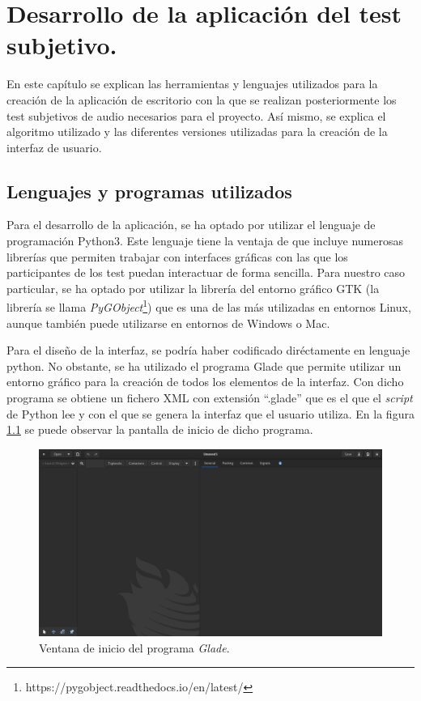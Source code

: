 \documentclass[11pt,a4paper,twoside]{book}
\author{Víctor de Tejada Molera}
\begin{document}
    \chapter{Desarrollo de la aplicación del test subjetivo.}
        En este capítulo se explican las herramientas y lenguajes utilizados para la creación de la aplicación de escritorio con la que se realizan posteriormente los test subjetivos de audio necesarios para el proyecto. Así mismo, se explica el algoritmo utilizado y las diferentes versiones utilizadas para la creación de la interfaz de usuario.
        
        \section{Lenguajes y programas utilizados}
            Para el desarrollo de la aplicación, se ha optado por utilizar el lenguaje de programación Python3. Este lenguaje tiene la ventaja de que incluye numerosas librerías que permiten trabajar con interfaces gráficas con las que los participantes de los test puedan interactuar de forma sencilla. Para nuestro caso particular, se ha optado por utilizar la librería del entorno gráfico GTK (la librería se llama \textit{PyGObject}\footnote{https://pygobject.readthedocs.io/en/latest/}) que es una de las más utilizadas en entornos Linux, aunque también puede utilizarse en entornos de Windows o Mac.
            
            Para el diseño de la interfaz, se podría haber codificado diréctamente en lenguaje python. No obstante, se ha utilizado el programa Glade que permite utilizar un entorno gráfico para la creación de todos los elementos de la interfaz. Con dicho programa se obtiene un fichero XML con extensión ``.glade'' que es el que el \textit{script} de Python lee y con el que se genera la interfaz que el usuario utiliza. En la figura \ref{fig:gladeInic} se puede observar la pantalla de inicio de dicho programa. 
            
            \begin{figure}
                \begin{center}
                    \includegraphics[scale=.2]{../imagenes/gladeInicio.png}
                    \caption{Ventana de inicio del programa \textit{Glade}.}
                    \label{fig:gladeInic}
                \end{center}
            \end{figure}
            
\end{document}
